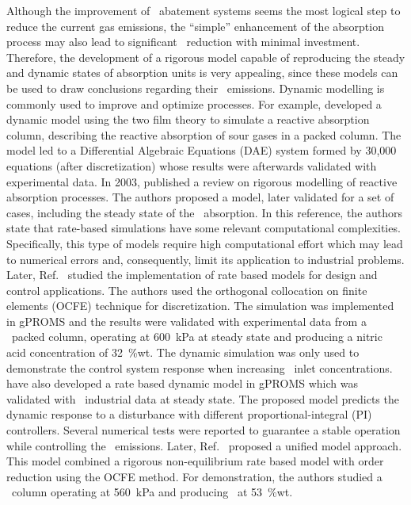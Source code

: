 \documentclass[journal=jacsat,manuscript=article]{achemso}
\newcommand{\nox}{\ce{NO_{\rmfamily{x}}}}
\newcommand{\hnotres}{\ce{HNO3}}
\begin{document}
Although the improvement of \nox~abatement systems seems the most logical step to reduce the current gas emissions, the ``simple'' enhancement of the absorption process may also lead to significant \nox~reduction with minimal investment. 
Therefore, the development of a rigorous model capable of reproducing the steady and dynamic states of absorption units
is very appealing, since these models can be used to draw conclusions regarding their \nox~emissions.
Dynamic modelling is commonly used to improve and optimize processes. For example, \citeauthor{Schneider2001} developed a dynamic model using the two film theory to simulate a reactive absorption column, describing the reactive absorption of sour gases in a packed column. The model led to a Differential Algebraic Equations (DAE) system formed by 30,000 equations (after discretization) whose results were afterwards validated with experimental data. 
 In 2003, \citeauthor{Kenig2003} published a review on rigorous modelling of reactive absorption processes. The authors proposed a model, later validated for a set of cases, including the steady state of the \nox~absorption. In this reference, the authors state that rate-based simulations have some relevant computational complexities. Specifically, this type of models require high computational effort which may lead to numerical errors and, consequently, limit its application to industrial problems. Later, Ref.~ studied the implementation of rate based models for design and control applications. The authors used the orthogonal collocation on finite elements (OCFE) technique for discretization. The simulation was implemented in gPROMS and the results were validated with experimental data from a \nox~packed column, operating at \SI{600}{\kilo\pascal} at steady state and producing a nitric acid concentration of \SI{32}{\percent}wt. The dynamic simulation was only used to demonstrate the control system response when increasing \nox~inlet concentrations.
\citeauthor{Dalaouti2005} have also developed a rate based dynamic model in gPROMS which was validated with \nox~industrial data at steady state. The proposed model predicts the dynamic response to a disturbance with different proportional-integral (PI) controllers. Several numerical tests were reported to guarantee a stable operation while controlling the \nox~emissions. Later, Ref.~ proposed a unified model approach. This model combined a rigorous non-equilibrium rate based model with order reduction using the OCFE method. For demonstration, the authors studied a \nox~column operating at \SI{560}{\kilo\pascal} and producing \hnotres~at \SI{53}{\percent}wt.
\end{document}
